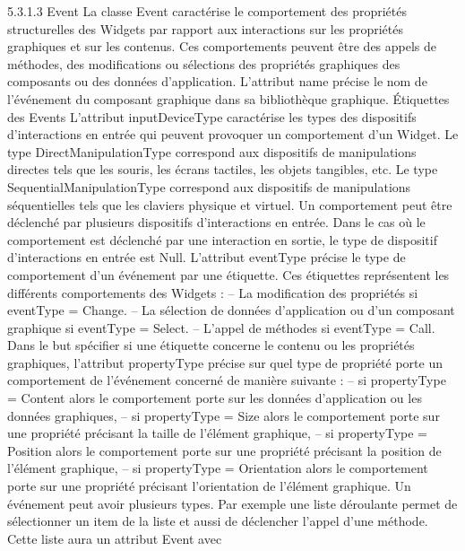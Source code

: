 \documentclass{article}
\begin{document}
5.3.1.3
Event
La classe Event caract\'{e}rise le comportement des propri\'{e}t\'{e}s structurelles des Widgets par rapport
aux interactions sur les propri\'{e}t\'{e}s graphiques et sur les contenus. Ces comportements peuvent \^{e}tre des
appels de m\'{e}thodes, des modiﬁcations ou s\'{e}lections des propri\'{e}t\'{e}s graphiques des composants ou des
donn\'{e}es d’application. L’attribut name pr\'{e}cise le nom de l’\'{e}v\'{e}nement du composant graphique dans
sa biblioth\`{e}que graphique.
Étiquettes des Events
L’attribut inputDeviceType caract\'{e}rise les types des dispositifs d’interactions
en entr\'{e}e qui peuvent provoquer un comportement d’un Widget. Le type DirectManipulationType correspond aux dispositifs de manipulations directes tels que les souris, les \'{e}crans tactiles, les objets
tangibles, etc. Le type SequentialManipulationType correspond aux dispositifs de manipulations s\'{e}quentielles tels que les claviers physique et virtuel. Un comportement peut \^{e}tre d\'{e}clench\'{e} par plusieurs
dispositifs d’interactions en entr\'{e}e. Dans le cas o\`{u} le comportement est d\'{e}clench\'{e} par une interaction
en sortie, le type de dispositif d’interactions en entr\'{e}e est Null.
L’attribut eventType pr\'{e}cise le type de comportement d’un \'{e}v\'{e}nement par une \'{e}tiquette. Ces \'{e}tiquettes repr\'{e}sentent les diff\'{e}rents comportements des Widgets :
– La modiﬁcation des propri\'{e}t\'{e}s si eventType = Change.
– La s\'{e}lection de donn\'{e}es d’application ou d’un composant graphique si eventType = Select.
– L’appel de m\'{e}thodes si eventType = Call.
Dans le but sp\'{e}ciﬁer si une \'{e}tiquette concerne le contenu ou les propri\'{e}t\'{e}s graphiques, l’attribut
propertyType pr\'{e}cise sur quel type de propri\'{e}t\'{e} porte un comportement de l’\'{e}v\'{e}nement concern\'{e} de
mani\`{e}re suivante :
– si propertyType = Content alors le comportement porte sur les donn\'{e}es d’application ou les
donn\'{e}es graphiques,
– si propertyType = Size alors le comportement porte sur une propri\'{e}t\'{e} pr\'{e}cisant la taille de
l’\'{e}l\'{e}ment graphique,
– si propertyType = Position alors le comportement porte sur une propri\'{e}t\'{e} pr\'{e}cisant la position
de l’\'{e}l\'{e}ment graphique,
– si propertyType = Orientation alors le comportement porte sur une propri\'{e}t\'{e} pr\'{e}cisant l’orientation de l’\'{e}l\'{e}ment graphique.
Un \'{e}v\'{e}nement peut avoir plusieurs types. Par exemple une liste d\'{e}roulante permet de s\'{e}lectionner
un item de la liste et aussi de d\'{e}clencher l’appel d’une m\'{e}thode. Cette liste aura un attribut Event avec
\end{document}
